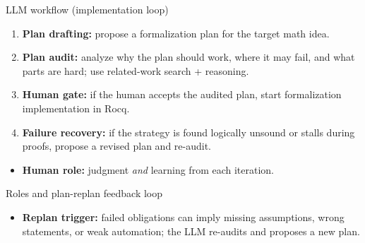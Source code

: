 \documentclass[10pt,aspectratio=169]{beamer}
\begin{document}
\begin{frame}{LLM workflow (implementation loop)}
  \begin{enumerate}
    \item \textbf{Plan drafting:} propose a formalization plan for the target math idea.
    \item \textbf{Plan audit:} analyze why the plan should work, where it may fail, and what parts are hard; use related-work search + reasoning.
    \item \textbf{Human gate:} if the human accepts the audited plan, start formalization implementation in Rocq.
    \item \textbf{Failure recovery:} if the strategy is found logically unsound or stalls during proofs, propose a revised plan and re-audit.
  \end{enumerate}
  \vspace{0.6em}
  \begin{itemize}
    \item \textbf{Human role:} judgment \emph{and} learning from each iteration.
  \end{itemize}
\end{frame}

\begin{frame}{Roles and plan-replan feedback loop}
  \begin{center}
  \end{center}
  \vspace{0.4em}
  \begin{itemize}
    \item \textbf{Replan trigger:} failed obligations can imply missing assumptions, wrong statements, or weak automation; the LLM re-audits and proposes a new plan.
  \end{itemize}
\end{frame}
\end{document}
